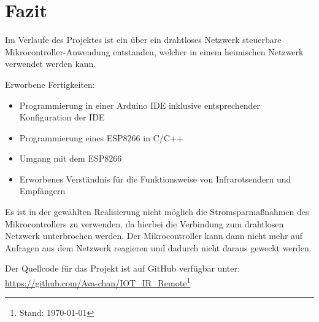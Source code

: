 \section{Fazit}

Im Verlaufe des Projektes ist ein über ein drahtloses Netzwerk steuerbare Mikrocontroller-Anwendung entstanden, welcher in einem heimischen Netzwerk verwendet werden kann.

Erworbene Fertigkeiten:
\begin{itemize}
	\item Programmierung in einer Arduino \acs{IDE} inklusive entsprechender Konfiguration der \acs{IDE}
	\item Programmierung eines ESP8266 in C/C++
	\item Umgang mit dem ESP8266
	\item Erworbenes Verständnis für die Funktionsweise von Infrarotsendern und Empfängern
\end{itemize} 

Es ist in der gewählten Realisierung nicht möglich die Stromsparmaßnahmen des Mikrocontrollers zu verwenden, da hierbei die Verbindung zum drahtlosen Netzwerk unterbrochen werden. Der Mikrocontroller kann dann nicht mehr auf Anfragen aus dem Netzwerk reagieren und dadurch nicht daraus geweckt werden.

Der Quellcode für das Projekt ist auf GitHub verfügbar unter:\\ \url{https://github.com/Ava-chan/IOT_IR_Remote}\footnote{Stand: \today}

\pagebreak

